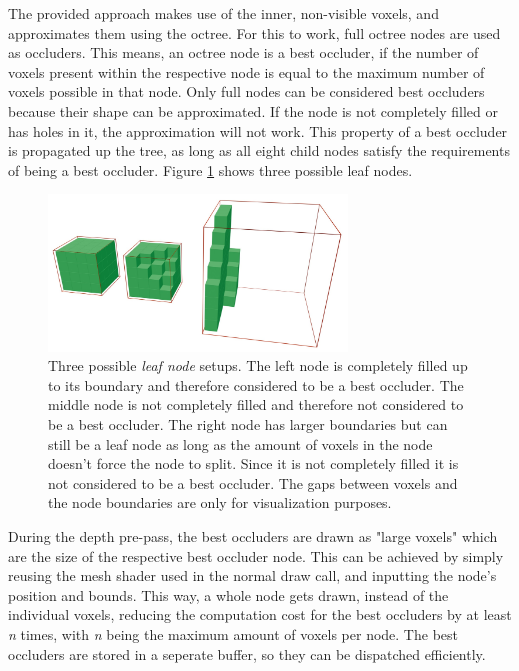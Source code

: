 \noindent
The provided approach makes use of the inner, non-visible voxels, and approximates them using the octree. For this 
to work, full octree nodes are used as occluders. This means, an octree node is a best occluder, if the number of 
voxels present within the respective node is equal to the maximum number of voxels possible in that node. Only full 
nodes can be considered best occluders because their shape can be approximated. If the node is not completely filled 
or has holes in it, the approximation will not work. This property of a best occluder is propagated up the tree, as 
long as all eight child nodes satisfy the requirements of being a best occluder. Figure 
\ref{fig:octreenode-filled-non-filled} shows three possible leaf nodes. 

\begin{figure}[h]
    \centering
    \includegraphics[width=300px]{images/graphics/octree-nodes-filled.jpg}
    \caption{Three possible \emph{leaf node} setups. The left node is completely filled up to its 
    boundary and therefore considered to be a best occluder. The middle node is not completely filled and therefore 
    not considered to be a best occluder. The right node has larger boundaries but can still be a leaf node as long 
    as the amount of voxels in the node doesn't force the node to split. Since it is not completely filled it is not 
    considered to be a best occluder. The gaps between voxels and the node boundaries are only for visualization 
    purposes.}
    \label{fig:octreenode-filled-non-filled}
\end{figure}

\noindent
During the depth pre-pass, the best occluders are drawn as "large voxels" which are the size of the respective 
best occluder node. This can be achieved by simply reusing the mesh shader used in the normal draw call, and 
inputting the node's position and bounds. This way, a whole node gets drawn, instead of the individual voxels, 
reducing the computation cost for the best occluders by at least \emph{n} times, with \emph{n} being the maximum 
amount of voxels per node. The best occluders are stored in a seperate buffer, so they can be dispatched efficiently. \\

